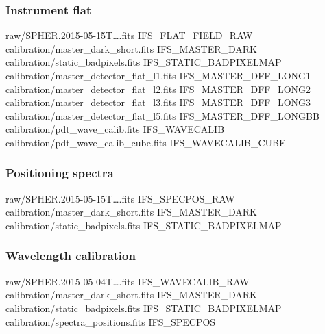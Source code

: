 \documentclass[twoside,single,12pt]{lion-msc}
\begin{document}
\subsubsection*{Instrument flat}
\begin{mdframed}[linewidth = 0.3mm, linecolor = black]
raw/SPHER.2015-05-15T\dots.fits IFS\_FLAT\_FIELD\_RAW\\
calibration/master\_dark\_short.fits IFS\_MASTER\_DARK\\
calibration/static\_badpixels.fits IFS\_STATIC\_BADPIXELMAP\\
calibration/master\_detector\_flat\_l1.fits IFS\_MASTER\_DFF\_LONG1\\
calibration/master\_detector\_flat\_l2.fits IFS\_MASTER\_DFF\_LONG2\\
calibration/master\_detector\_flat\_l3.fits IFS\_MASTER\_DFF\_LONG3\\
calibration/master\_detector\_flat\_l5.fits IFS\_MASTER\_DFF\_LONGBB\\
calibration/pdt\_wave\_calib.fits IFS\_WAVECALIB\\
calibration/pdt\_wave\_calib\_cube.fits IFS\_WAVECALIB\_CUBE
\end{mdframed}

\subsubsection*{Positioning spectra}
\begin{mdframed}[linewidth = 0.3mm, linecolor = black]
raw/SPHER.2015-05-15T\dots.fits IFS\_SPECPOS\_RAW\\
calibration/master\_dark\_short.fits IFS\_MASTER\_DARK\\
calibration/static\_badpixels.fits IFS\_STATIC\_BADPIXELMAP
\end{mdframed}

\subsubsection*{Wavelength calibration}
\begin{mdframed}[linewidth = 0.3mm, linecolor = black]
raw/SPHER.2015-05-04T\dots.fits IFS\_WAVECALIB\_RAW\\
calibration/master\_dark\_short.fits IFS\_MASTER\_DARK\\
calibration/static\_badpixels.fits IFS\_STATIC\_BADPIXELMAP\\
calibration/spectra\_positions.fits IFS\_SPECPOS
\end{mdframed}
\end{document}
